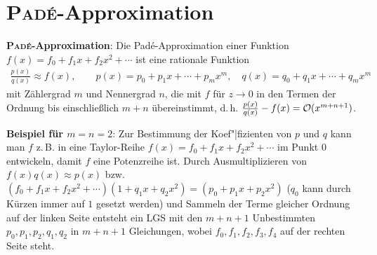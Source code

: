 \section{%
    \textsc{Padé}-Approximation%
}

\textbf{\textsc{Padé}-Approximation}:
Die Padé-Approximation einer Funktion $f(x) = f_0 + f_1 x + f_2 x^2 + \dotsb$
ist eine rationale Funktion
\begin{align*}
    \frac{p(x)}{q(x)} \approx f(x), \qquad
    p(x) = p_0 + p_1 x + \dotsb + p_m x^m, \quad
    q(x) = q_0 + q_1 x + \dotsb + q_m x^m
\end{align*}
mit Zählergrad $m$ und Nennergrad $n$,
die mit $f$ für $z \to 0$ in den Termen der Ordnung bis einschließlich $m + n$
übereinstimmt, d.\,h. $\frac{p(x)}{q(x)} - f(x) = \operatorname{\mathcal{O}}(x^{m+n+1})$.

\textbf{Beispiel für $m = n = 2$}:
Zur Bestimmung der Koef"|fizienten von $p$ und $q$ kann man $f$ z.\,B. in
eine Taylor-Reihe $f(x) = f_0 + f_1 x + f_2 x^2 + \dotsb$ im Punkt $0$
entwickeln, damit $f$ eine Potenzreihe ist.
Durch Ausmultiplizieren von $f(x) q(x) \approx p(x)$ bzw. \\
$(f_0 + f_1 x + f_2 x^2 + \dotsb) (1 + q_1 x + q_2 x^2) =
(p_0 + p_1 x + p_2 x^2)$ ($q_0$ kann durch Kürzen immer auf $1$ gesetzt werden)
und Sammeln der Terme gleicher Ordnung auf der linken Seite entsteht ein
LGS mit den $m + n + 1$ Unbestimmten $p_0, p_1, p_2, q_1, q_2$
in $m + n + 1$ Gleichungen, wobei $f_0, f_1, f_2, f_3, f_4$ auf der
rechten Seite steht.

\pagebreak
